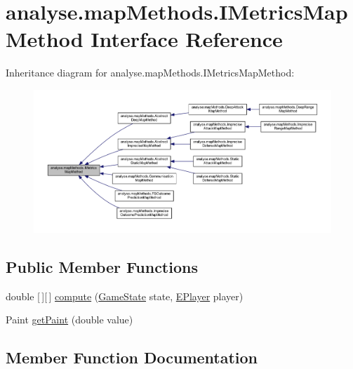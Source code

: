\hypertarget{interfaceanalyse_1_1map_methods_1_1_i_metrics_map_method}{}\section{analyse.\+map\+Methods.\+I\+Metrics\+Map\+Method Interface Reference}
\label{interfaceanalyse_1_1map_methods_1_1_i_metrics_map_method}


Inheritance diagram for analyse.\+map\+Methods.\+I\+Metrics\+Map\+Method\+:
\nopagebreak
\begin{figure}[H]
\begin{center}
\leavevmode
\includegraphics[width=350pt]{interfaceanalyse_1_1map_methods_1_1_i_metrics_map_method__inherit__graph}
\end{center}
\end{figure}
\subsection*{Public Member Functions}
\begin{DoxyCompactItemize}
\item 
double \mbox{[}$\,$\mbox{]}\mbox{[}$\,$\mbox{]} \mbox{\hyperlink{interfaceanalyse_1_1map_methods_1_1_i_metrics_map_method_aef15b826032a8cc1140563d539dd1319}{compute}} (\mbox{\hyperlink{classgame_1_1game_state_1_1_game_state}{Game\+State}} state, \mbox{\hyperlink{enumgame_1_1_e_player}{E\+Player}} player)
\item 
Paint \mbox{\hyperlink{interfaceanalyse_1_1map_methods_1_1_i_metrics_map_method_a102909023c32cebe3bc75052f55b24a0}{get\+Paint}} (double value)
\end{DoxyCompactItemize}


\subsection{Member Function Documentation}
\mbox{\label{interfaceanalyse_1_1map_methods_1_1_i_metrics_map_method_aef15b826032a8cc1140563d539dd1319}} 
